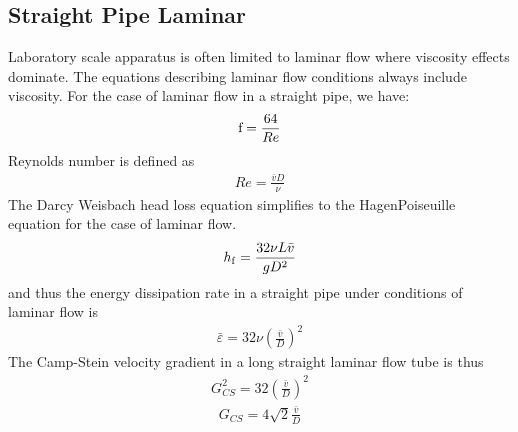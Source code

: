 \documentclass[letterpaper,10pt,english]{sphinxmanual}
\begin{document}
\subsection{Straight Pipe Laminar}
\label{\detokenize{Rapid_Mix/RM_Derivations:straight-pipe-laminar}}\label{\detokenize{Rapid_Mix/RM_Derivations:heading-straight-pipe-laminar}}
Laboratory scale apparatus is often limited to laminar flow where viscosity effects dominate. The equations describing laminar flow conditions always include viscosity. For the case of laminar flow in a straight pipe, we have:
\begin{equation}\label{equation:Rapid_Mix/RM_Derivations:Rapid_Mix/RM_Derivations:56}
\begin{split}{\rm f} = \frac{64}{Re}\end{split}
\end{equation}
Reynolds number is defined as
\begin{equation}\label{equation:Rapid_Mix/RM_Derivations:Rapid_Mix/RM_Derivations:57}
\begin{split}Re= \frac{\bar vD}{\nu}\end{split}
\end{equation}
The Darcy Weisbach head loss equation simplifies to the Hagen\textendash{}Poiseuille equation for the case of laminar flow.
\begin{equation}\label{equation:Rapid_Mix/RM_Derivations:Rapid_Mix/RM_Derivations:58}
\begin{split}h_{{\rm f}} = \frac{32\nu L\bar v}{gD^2}\end{split}
\end{equation}
and thus the energy dissipation rate in a straight pipe under conditions of laminar flow is
\begin{equation}\label{equation:Rapid_Mix/RM_Derivations:Rapid_Mix/RM_Derivations:59}
\begin{split}\bar\varepsilon =32\nu \left( \frac{\bar v}{D} \right)^2\end{split}
\end{equation}
The Camp-Stein velocity gradient in a long straight laminar flow tube is thus
\begin{equation}\label{equation:Rapid_Mix/RM_Derivations:Rapid_Mix/RM_Derivations:60}
\begin{split}G_{CS}^2 =32 \left( \frac{\bar v}{D} \right)^2\end{split}
\end{equation}\begin{equation}\label{equation:Rapid_Mix/RM_Derivations:Rapid_Mix/RM_Derivations:61}
\begin{split}G_{CS} =4\sqrt2 \frac{\bar v}{D}\end{split}
\end{equation}
\end{document}

